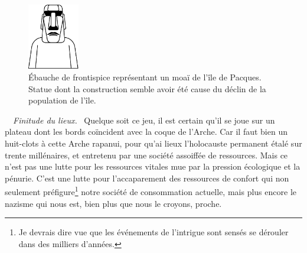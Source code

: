 \begin{figure}
	\vspace{-1em} %
	\centering
	\includegraphics[width=0.2\textwidth]{frontispice-moai.pdf}
	\caption{Ébauche de frontispice représentant un moaï de l’île de Pacques. Statue dont la construction semble avoir été cause du déclin de la population de l’île.}
	\vspace{-4em} %
\end{figure}
\
\
{\em\normalsize Finitude du lieux.}~
Quelque soit ce jeu, il est certain qu’il se joue sur un plateau dont les bords coïncident avec la coque de l’Arche. Car il faut bien un huit-clots à cette Arche rapanui, pour qu’ai  lieux  l’holocauste permanent étalé sur trente millénaires, et entretenu par une société assoiffée de ressources. Mais ce n’est pas une lutte pour les ressources vitales mue par la pression écologique et la pénurie. C’est une lutte pour l’accaparement des ressources de confort qui non seulement préfigure\footnote{Je devrais dire  vue que les événements de l’intrigue sont sensés se dérouler dans des milliers d’années.} notre société de consommation actuelle, mais plus encore  le nazisme qui nous est, bien plus que nous le croyons, proche.

